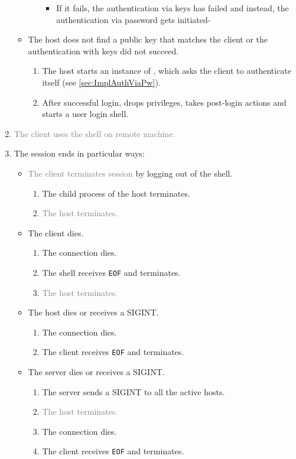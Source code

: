 \documentclass[10pt,a4paper,titlepage,twoside,english,final]{zhawreprt}
\begin{document}
\begin{enumerate}
\begin{itemize}
\begin{enumerate}
\begin{itemize}
\begin{enumerate}
			\end{enumerate}
			\item If it fails, the authentication via keys has failed and instead, the authentication via password gets initiated-
		\end{itemize}
	\end{enumerate}
	\item The host does not find a public key that matches the client or the authentication with keys did not succeed.
	\begin{enumerate}
		\item The host starts an instance of \cite{login}, which asks the client to authenticate itself (see \ref{sec:ImplAuthViaPw}).
		\item After successful \gls{login}, \cite{login} drops privileges, takes post-\gls{login} actions and starts a user \gls{login} \gls{shell}.
	\end{enumerate}
\end{itemize}
\item \textcolor{gray}{The client uses the \gls{shell} on remote machine.}
\item The session ends in particular ways:
\begin{itemize}
	\item \textcolor{gray}{The client terminates session} by logging out of the \gls{shell}.
	\begin{enumerate}
		\item The child process of the host terminates.
		\item \textcolor{gray}{The host terminates.}
	\end{enumerate}
	\item The client dies.
	\begin{enumerate}
		\item The connection dies.
		\item The \gls{shell} receives \texttt{EOF} and terminates.
		\item \textcolor{gray}{The host terminates.}
	\end{enumerate}
	\item The host dies or receives a \gls{SIGINT}.
	\begin{enumerate}
		\item The connection dies.
		\item The client receives \texttt{EOF} and terminates.
	\end{enumerate}
	\item The server dies or receives a \gls{SIGINT}.
	\begin{enumerate}
		\item The server sends a \gls{SIGINT} to all the active hosts.
		\item \textcolor{gray}{The host terminates.}
		\item The connection dies.
		\item The client receives \texttt{EOF} and terminates.
	\end{enumerate}
\end{itemize}
\end{enumerate}
\end{document}
